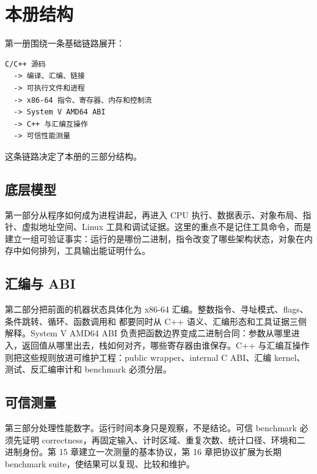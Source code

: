 \chapter*{本册结构}

第一册围绕一条基础链路展开：

\begin{center}
\begin{minipage}{0.86\linewidth}
\begin{verbatim}
C/C++ 源码
  -> 编译、汇编、链接
  -> 可执行文件和进程
  -> x86-64 指令、寄存器、内存和控制流
  -> System V AMD64 ABI
  -> C++ 与汇编互操作
  -> 可信性能测量
\end{verbatim}
\end{minipage}
\end{center}

这条链路决定了本册的三部分结构。

\section*{底层模型}

第一部分从程序如何成为进程讲起，再进入 CPU 执行、数据表示、对象布局、指针、虚拟地址空间、Linux 工具和调试证据。这里的重点不是记住工具命令，而是建立一组可验证事实：运行的是哪份二进制，指令改变了哪些架构状态，对象在内存中如何排列，工具输出能证明什么。

\section*{汇编与 ABI}

第二部分把前面的机器状态具体化为 x86-64 汇编。整数指令、寻址模式、flags、条件跳转、循环、函数调用和  都要同时从 C++ 语义、汇编形态和工具证据三侧解释。System V AMD64 ABI 负责把函数边界变成二进制合同：参数从哪里进入，返回值从哪里出去，栈如何对齐，哪些寄存器由谁保存。C++ 与汇编互操作则把这些规则放进可维护工程：public wrapper、internal C ABI、汇编 kernel、测试、反汇编审计和 benchmark 必须分层。

\section*{可信测量}

第三部分处理性能数字。运行时间本身只是观察，不是结论。可信 benchmark 必须先证明 correctness，再固定输入、计时区域、重复次数、统计口径、环境和二进制身份。第 15 章建立一次测量的基本协议，第 16 章把协议扩展为长期 benchmark suite，使结果可以复现、比较和维护。

